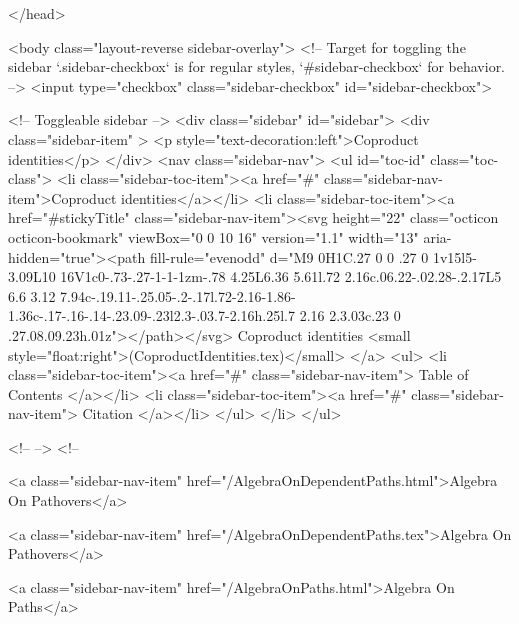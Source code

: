 </head>


  <body class="layout-reverse sidebar-overlay">
    <!-- Target for toggling the sidebar `.sidebar-checkbox` is for regular
     styles, `#sidebar-checkbox` for behavior. -->
<input type="checkbox" class="sidebar-checkbox" id="sidebar-checkbox">

<!-- Toggleable sidebar -->
<div class="sidebar" id="sidebar">
  <div class="sidebar-item" >
    <p style="text-decoration:left">Coproduct identities</p>
  </div>
  <nav class="sidebar-nav">
    <ul id="toc-id" class="toc-class">
  <li class="sidebar-toc-item"><a href="#" class="sidebar-nav-item">Coproduct identities</a></li>
  <li class="sidebar-toc-item"><a href="#stickyTitle" class="sidebar-nav-item"><svg height="22" class="octicon octicon-bookmark" viewBox="0 0 10 16" version="1.1" width="13" aria-hidden="true"><path fill-rule="evenodd" d="M9 0H1C.27 0 0 .27 0 1v15l5-3.09L10 16V1c0-.73-.27-1-1-1zm-.78 4.25L6.36 5.61l.72 2.16c.06.22-.02.28-.2.17L5 6.6 3.12 7.94c-.19.11-.25.05-.2-.17l.72-2.16-1.86-1.36c-.17-.16-.14-.23.09-.23l2.3-.03.7-2.16h.25l.7 2.16 2.3.03c.23 0 .27.08.09.23h.01z"></path></svg> Coproduct identities <small style="float:right">(CoproductIdentities.tex)</small>
</a>
    <ul>
      <li class="sidebar-toc-item"><a href="#" class="sidebar-nav-item"> Table of Contents </a></li>
      <li class="sidebar-toc-item"><a href="#" class="sidebar-nav-item"> Citation </a></li>
    </ul>
  </li>
</ul>


    <!--  -->
    <!-- 
      
    
      
    
      
    
      
        
      
    
      
        
          <a class="sidebar-nav-item" href="/AlgebraOnDependentPaths.html">Algebra On Pathovers</a>
        
      
    
      
        
          <a class="sidebar-nav-item" href="/AlgebraOnDependentPaths.tex">Algebra On Pathovers</a>
        
      
    
      
        
          <a class="sidebar-nav-item" href="/AlgebraOnPaths.html">Algebra On Paths</a>
        
      
    
      
        
